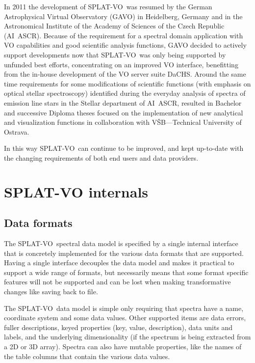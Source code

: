 \documentclass[final,authoryear,5p,times,twocolumn]{elsarticle}
\newcommand{\splatvo}{{\textsf{\small{SPLAT-VO}}}}
\newcommand{\dachs}{\textsf{\small DaCHS}}
\begin{document}
In 2011 the development of  \splatvo\ was resumed by the German Astrophysical
Virtual Observatory (GAVO) in Heidelberg, Germany and in  the Astronomical
Institute of the Academy of Sciences of the Czech Republic (AI~ASCR).  Because
of the requirement for a spectral domain application with VO capabilities and good
scientific analysis functions, GAVO  decided to actively support developments now that
\splatvo\ was only being supported by unfunded best efforts, concentrating on an improved VO interface,
benefitting from the in-house development of the VO server suite \dachs.  Around
the same time requirements for some modifications of scientific functions (with
emphasis on optical stellar spectroscopy) identified during the everyday
analysis of spectra of emission line stars in the Stellar department of AI~ASCR,
resulted in Bachelor and successive Diploma theses focused on the implementation of
new analytical and visualization functions in collaboration with
V\v{S}B---Technical University of Ostrava. 

In this way \splatvo\ can continue to be improved, and kept up-to-date with the
changing requirements of both end users and data providers.  


\section{SPLAT-VO internals}

\subsection{Data formats}

The \splatvo\ spectral data model is specified by a single internal interface
that is concretely implemented for the various data formats that are
supported. Having a single interface decouples the data model and makes it
practical to support a wide range of formats, but necessarily means that some
format specific features will not be supported and can be lost when making
transformative changes like saving back to file.

The \splatvo\ data model is simple only requiring that spectra have a name,
coordinate system and some data values. Other supported items are data errors,
fuller descriptions, keyed properties (key, value, description), data units
and labels, and the underlying dimensionality (if the spectrum is being
extracted from a 2D or 3D array). Spectra can also have mutable properties,
like the names of the table columns that contain the various data values.
\end{document}
